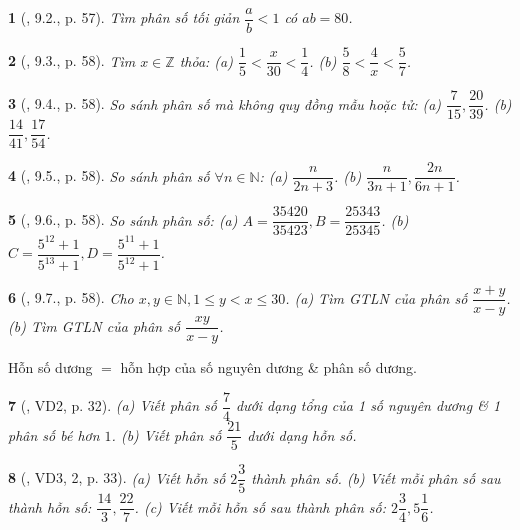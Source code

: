 \documentclass{article}
\newtheorem{baitoan}{}
\begin{document}
\begin{baitoan}[\cite{TLCT_THCS_Toan_6_so_hoc}, 9.2., p. 57]
	Tìm phân số tối giản $\dfrac{a}{b} < 1$ có $ab = 80$.
\end{baitoan}

\begin{baitoan}[\cite{TLCT_THCS_Toan_6_so_hoc}, 9.3., p. 58]
	Tìm $x\in\mathbb{Z}$ thỏa: (a) $\dfrac{1}{5} < \dfrac{x}{30} < \dfrac{1}{4}$. (b) $\dfrac{5}{8} < \dfrac{4}{x} < \dfrac{5}{7}$.
\end{baitoan}

\begin{baitoan}[\cite{TLCT_THCS_Toan_6_so_hoc}, 9.4., p. 58]
	So sánh phân số mà không quy đồng mẫu hoặc tử: (a) $\dfrac{7}{15},\dfrac{20}{39}$. (b) $\dfrac{14}{41},\dfrac{17}{54}$.
\end{baitoan}

\begin{baitoan}[\cite{TLCT_THCS_Toan_6_so_hoc}, 9.5., p. 58]
	So sánh phân số $\forall n\in\mathbb{N}$: (a) $\dfrac{n}{2n + 3}$. (b) $\dfrac{n}{3n + 1},\dfrac{2n}{6n + 1}$.
\end{baitoan}

\begin{baitoan}[\cite{TLCT_THCS_Toan_6_so_hoc}, 9.6., p. 58]
	So sánh phân số: (a) $A = \dfrac{35420}{35423},B = \dfrac{25343}{25345}$. (b) $C = \dfrac{5^{12} + 1}{5^{13} + 1},D = \dfrac{5^{11} + 1}{5^{12} + 1}$.
\end{baitoan}

\begin{baitoan}[\cite{TLCT_THCS_Toan_6_so_hoc}, 9.7., p. 58]
	Cho $x,y\in\mathbb{N},1\le y < x\le30$. (a) Tìm {\rm GTLN} của phân số $\dfrac{x + y}{x - y}$. (b) Tìm {\rm GTLN} của phân số $\dfrac{xy}{x - y}$.
\end{baitoan}

Hỗn số dương $=$ hỗn hợp của số nguyên dương \& phân số dương.

\begin{baitoan}[\cite{Binh_Toan_6_tap_2}, VD2, p. 32]
	(a) Viết phân số $\dfrac{7}{4}$ dưới dạng tổng của 1 số nguyên dương \& 1 phân số bé hơn $1$. (b) Viết phân số $\dfrac{21}{5}$ dưới dạng hỗn số.
\end{baitoan}

\begin{baitoan}[\cite{Binh_Toan_6_tap_2}, VD3, 2, p. 33]
	(a) Viết hỗn số $2\dfrac{3}{5}$ thành phân số. (b) Viết mỗi phân số sau thành hỗn số: $\dfrac{14}{3},\dfrac{22}{7}$. (c) Viết mỗi hỗn số sau thành phân số: $2\dfrac{3}{4},5\dfrac{1}{6}$.
\end{baitoan}
\end{document}
